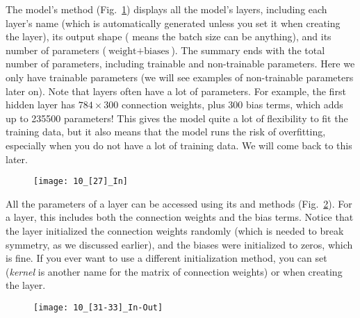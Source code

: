 The model's  method (Fig.~\ref{10_[27]_In}) displays all the model's layers, including each layer's name (which is automatically generated unless you set it when creating the layer), its output shape ( means the batch size can be anything), and its number of parameters ($\text{weight}+\text{biases}$). The summary ends with the total number of parameters, including trainable and non-trainable parameters. Here we only have trainable parameters (we will see examples of non-trainable parameters later on). Note that  layers often have a lot of parameters. For example, the first hidden layer has $784\times300$ connection weights, plus $300$ bias terms, which adds up to \num{235500} parameters! This gives the model quite a lot of flexibility to fit the training data, but it also means that the model runs the risk of overfitting, especially when you do not have a lot of training data. We will come back to this later.
\begin{figure}[h!t]
\centering
\texttt{[image: 10\_[27]\_In]}
\caption{}\label{10_[27]_In}
\end{figure}

All the parameters of a layer can be accessed using its  and  methods (Fig.~\ref{10_[31-33]_In-Out}). For a  layer, this includes both the connection weights and the bias terms. Notice that the  layer initialized the connection weights randomly (which is needed to break symmetry, as we discussed earlier), and the biases were initialized to zeros, which is fine. If you ever want to use a different initialization method, you can set  (\emph{kernel} is another name for the matrix of connection weights) or  when creating the layer.
\begin{figure}[h!t]
\centering
\texttt{[image: 10\_[31-33]\_In-Out]}
\caption{}\label{10_[31-33]_In-Out}
\end{figure}
